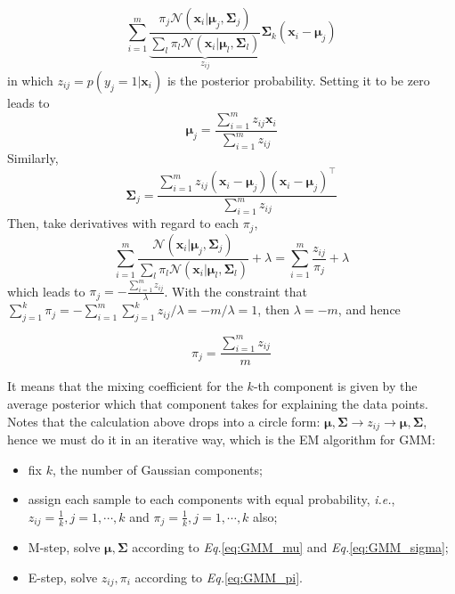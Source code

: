 \documentclass{article}
\begin{document}
	\begin{equation*}
	\sum_{i=1}^m \underbrace{\frac{\pi_j  \mathcal{N} (\bm{x}_i|\bm{\mu}_j,\bm{\Sigma}_j)}{\sum_l \pi_l \mathcal{N} (\bm{x}_i|\bm{\mu}_l,\bm{\Sigma}_l)}}_{z_{ij}} \bm{\Sigma}_k (\bm{x}_i - \bm{\mu}_j)
	\end{equation*}
in which $z_{ij}=p(y_j=1|\bm{x}_i)$ is the posterior probability. Setting it to be zero leads to
	\begin{equation}
	\label{eq:GMM_mu}
	\bm{\mu}_j=\frac{\sum_{i=1}^m z_{ij} \bm{x}_i}{\sum_{i=1}^m z_{ij}}
	\end{equation}
Similarly,
	\begin{equation}
	\label{eq:GMM_sigma}
	\bm{\Sigma}_j=\frac{\sum_{i=1}^m z_{ij} (\bm{x}_i-\bm{\mu}_j)(\bm{x}_i-\bm{\mu}_j)^\top}{\sum_{i=1}^m z_{ij}}
	\end{equation}
	Then, take derivatives with regard to each $\pi_j$,
	\begin{equation*}
	\sum_{i=1}^m \frac{\mathcal{N} (\bm{x}_i|\bm{\mu}_j,\bm{\Sigma}_j) }{\sum_l \pi_l \mathcal{N} (\bm{x}_i|\bm{\mu}_l,\bm{\Sigma}_l)} + \lambda = \sum_{i=1}^m \frac{z_{ij}}{\pi_j} + \lambda
	\end{equation*}
which leads to $\pi_j=-\frac{\sum_{i=1}^m z_{ij}}{\lambda}$. With the constraint that $\sum_{j=1}^k\pi_j=-\sum_{i=1}^m\sum_{j=1}^k z_{ij}/\lambda = -m/\lambda=1$, then $\lambda=-m$, and hence

	\begin{equation}
	\label{eq:GMM_pi}
	\pi_j=\frac{\sum_{i=1}^m z_{ij}}{m}
	\end{equation}
	
	It means that the mixing coefficient for the $k$-th component is given by the average posterior which that component takes for explaining the data points. Notes that the calculation above drops into a circle form: $\bm{\mu}, \bm{\Sigma} \rightarrow z_{ij} \rightarrow \bm{\mu}, \bm{\Sigma}$, hence we must do it in an iterative way, which is the EM algorithm for GMM:
	\begin{shaded}
    \begin{itemize}
	\item fix $k$, the number of Gaussian components;
	\item assign each sample to each components with equal probability, \textit{i.e.}, $z_{ij}=\frac{1}{k},j=1,\cdots,k$ and $\pi_j=\frac{1}{k},j=1,\cdots,k$ also;
	\item M-step, solve $\bm{\mu}, \bm{\Sigma}$ according to \textit{Eq.}\ref{eq:GMM_mu} and \textit{Eq.}\ref{eq:GMM_sigma};
	\item E-step, solve $z_{ij},\pi_i$ according to \textit{Eq.}\ref{eq:GMM_pi}.
	\end{itemize}
  	\end{shaded}
\end{document}
